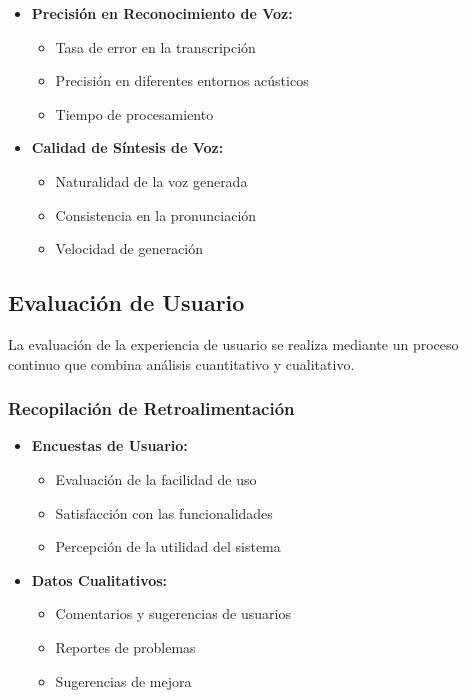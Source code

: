 \begin{itemize}
	\item \textbf{Precisión en Reconocimiento de Voz:}
	      \begin{itemize}
		      \item Tasa de error en la transcripción
		      \item Precisión en diferentes entornos acústicos
		      \item Tiempo de procesamiento
	      \end{itemize}

	\item \textbf{Calidad de Síntesis de Voz:}
	      \begin{itemize}
		      \item Naturalidad de la voz generada
		      \item Consistencia en la pronunciación
		      \item Velocidad de generación
	      \end{itemize}
\end{itemize}

\subsection{Evaluación de Usuario}
\label{evaluacion-usuario}

La evaluación de la experiencia de usuario se realiza mediante un proceso continuo que combina análisis cuantitativo y cualitativo.

\subsubsection{Recopilación de Retroalimentación}

\begin{itemize}
	\item \textbf{Encuestas de Usuario:}
	      \begin{itemize}
		      \item Evaluación de la facilidad de uso
		      \item Satisfacción con las funcionalidades
		      \item Percepción de la utilidad del sistema
	      \end{itemize}

	\item \textbf{Datos Cualitativos:}
	      \begin{itemize}
		      \item Comentarios y sugerencias de usuarios
		      \item Reportes de problemas
		      \item Sugerencias de mejora
	      \end{itemize}
\end{itemize}

